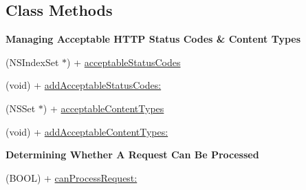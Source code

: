 \subsection*{Class Methods}
\begin{Indent}{\bf Managing Acceptable H\-T\-T\-P Status Codes \& Content Types}\par
{\em 

 

 }\begin{DoxyCompactItemize}
\item 
(N\-S\-Index\-Set $\ast$) + \hyperlink{interface_a_f_h_t_t_p_request_operation_a7fedad9727925d5bd723f8ad677b5ade}{acceptable\-Status\-Codes}
\item 
(void) + \hyperlink{interface_a_f_h_t_t_p_request_operation_a6dcbb7ca30906416ae8848cce05d209b}{add\-Acceptable\-Status\-Codes\-:}
\item 
(N\-S\-Set $\ast$) + \hyperlink{interface_a_f_h_t_t_p_request_operation_af4cb7def98220fc0d412f3d934c1f916}{acceptable\-Content\-Types}
\item 
(void) + \hyperlink{interface_a_f_h_t_t_p_request_operation_a1b80d7d851a3b135e44629e04a0ca72e}{add\-Acceptable\-Content\-Types\-:}
\end{DoxyCompactItemize}
\end{Indent}
\begin{Indent}{\bf Determining Whether A Request Can Be Processed}\par
{\em 

 

 }\begin{DoxyCompactItemize}
\item 
(B\-O\-O\-L) + \hyperlink{interface_a_f_h_t_t_p_request_operation_a926e52cb83df877f80565e7f0bdcda92}{can\-Process\-Request\-:}
\end{DoxyCompactItemize}
\end{Indent}
